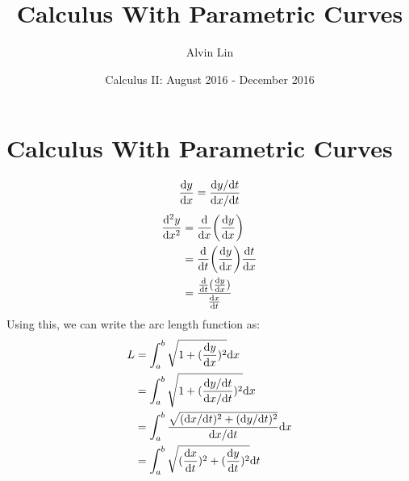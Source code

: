 \documentclass[letterpaper, 12pt]{math}
\title{Calculus With Parametric Curves}
\author{Alvin Lin}
\date{Calculus II: August 2016 - December 2016}
\begin{document}
\maketitle

\section*{Calculus With Parametric Curves}
\[ \frac{\mathrm{d}{y}}{\mathrm{d}{x}} = \frac{\mathrm{d}{y}/\mathrm{d}{t}}{\mathrm{d}{x}/\mathrm{d}{t}} \]
\begin{align*}
  \frac{\mathrm{d^2}{y}}{\mathrm{d}{x}^{2}} &=
    \frac{\mathrm{d}}{\mathrm{d}{x}}\bigg(\frac{\mathrm{d}{y}}{\mathrm{d}{x}}\bigg) \\
  &= \frac{\mathrm{d}}{\mathrm{d}{t}}\bigg(\frac{\mathrm{d}{y}}{\mathrm{d}{x}}\bigg)
     \frac{\mathrm{d}{t}}{\mathrm{d}{x}} \\
  &= \frac{\frac{\mathrm{d}}{\mathrm{d}{t}}(\frac{\mathrm{d}{y}}{\mathrm{d}{x}})}
      {\frac{\mathrm{d}{x}}{\mathrm{d}{t}}} \\
\end{align*}
Using this, we can write the arc length function as:
\begin{align*}
  L &= \int_{a}^{b}{\sqrt{1+(\frac{\mathrm{d}{y}}{\mathrm{d}{x}})^{2}}\mathrm{d}{x}} \\
  &= \int_{a}^{b}{
    \sqrt{1+(\frac{\mathrm{d}{y}/\mathrm{d}{t}}{\mathrm{d}{x}/\mathrm{d}{t}})^{2}}\mathrm{d}{x}} \\
  &= \int_{a}^{b}{\frac{
    \sqrt{(\mathrm{d}{x}/\mathrm{d}{t})^{2}+(\mathrm{d}{y}/\mathrm{d}{t})^{2}}
  }{\mathrm{d}{x}/\mathrm{d}{t}}\mathrm{d}{x}} \\
  &= \int_{a}^{b}{\sqrt{
    (\frac{\mathrm{d}{x}}{\mathrm{d}{t}})^{2}+(\frac{\mathrm{d}{y}}{\mathrm{d}{t}})^{2}}\mathrm{d}{t}}
\end{align*}
\end{document}
